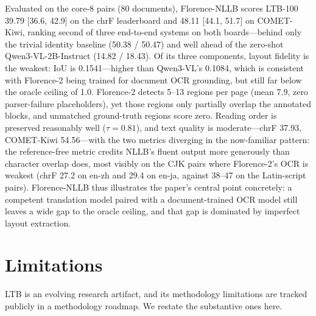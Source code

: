 \documentclass[11pt]{article}
\begin{document}
Evaluated on the core-8 pairs (80 documents), Florence-NLLB scores LTB-100
39.79 [36.6, 42.9] on the chrF leaderboard and 48.11 [44.1, 51.7] on
COMET-Kiwi, ranking second of three end-to-end systems on both boards---behind
only the trivial identity baseline (50.38 / 50.47) and well ahead of the
zero-shot Qwen3-VL-2B-Instruct (14.82 / 18.43). Of its three components, layout
fidelity is the weakest: IoU is 0.1541---higher than Qwen3-VL's 0.1084, which is
consistent with Florence-2 being trained for document OCR grounding, but still
far below the oracle ceiling of 1.0. Florence-2 detects 5--13 regions per page
(mean 7.9, zero parser-failure placeholders), yet those regions only partially
overlap the annotated blocks, and unmatched ground-truth regions score zero.
Reading order is preserved reasonably well ($\tau = 0.81$), and text quality is
moderate---chrF 37.93, COMET-Kiwi 54.56---with the two metrics diverging in the
now-familiar pattern: the reference-free metric credits NLLB's fluent output
more generously than character overlap does, most visibly on the CJK pairs where
Florence-2's OCR is weakest (chrF 27.2 on en-zh and 29.4 on en-ja, against
38--47 on the Latin-script pairs). Florence-NLLB thus illustrates the paper's
central point concretely: a competent translation model paired with a
document-trained OCR model still leaves a wide gap to the oracle ceiling, and
that gap is dominated by imperfect layout extraction.

\section{Limitations}
\label{sec:limitations}

LTB is an evolving research artifact, and its methodology limitations are
tracked publicly in a methodology roadmap. We restate the substantive ones here.
\end{document}

